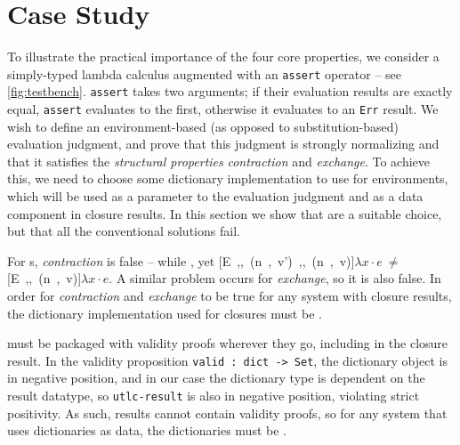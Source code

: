 \section{Case Study}
\label{sec:CaseStudy}

To illustrate the practical importance of the four core properties, we consider a simply-typed lambda calculus
augmented with an \texttt{assert} operator -- see \autoref{fig:testbench}.
\texttt{assert} takes two arguments; if their evaluation results are exactly equal, \texttt{assert} evaluates to the first,
otherwise it evaluates to an \texttt{Err} result. We wish to define an environment-based (as opposed to substitution-based)
evaluation judgment, and prove that this judgment is strongly normalizing and that it  satisfies the
\emph{structural properties} \emph{contraction} and \emph{exchange}. To achieve this,
we need to choose some dictionary implementation to use for environments,
which will be used as a parameter to the evaluation judgment and as a data component in closure results.
In this section we show that \dds{} are a suitable choice, but that all the conventional solutions fail.



For \sal{}s, \emph{contraction} is false --
while , yet
\hbox{[E ,, (n , v') ,, (n , v)]$\lambda x \cdot e$}$~\ne~$\hbox{[E ,, (n , v)]$\lambda x \cdot e$}.
A similar problem occurs for \emph{exchange}, so it is also false.
In order for \emph{contraction} and \emph{exchange} to be true for any system with closure results,
the dictionary implementation used for closures must be \extensional.

\Cals{} must be packaged with validity proofs wherever they go, including in the closure result.
In the validity proposition \texttt{valid : dict -> Set}, the dictionary object is in negative position,
and in our case the dictionary type is dependent on the result datatype,
so \texttt{utlc-result} is also in negative position, violating strict positivity.
As such, results cannot contain validity proofs, so for any system that uses dictionaries as data,
the dictionaries must be \total.


